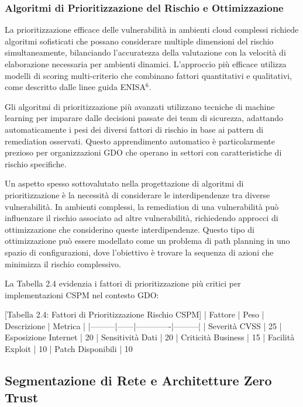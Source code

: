{\subsubsection{Algoritmi di Prioritizzazione del Rischio e Ottimizzazione}

La prioritizzazione efficace delle vulnerabilità in ambienti cloud complessi richiede algoritmi sofisticati che possano considerare multiple dimensioni del rischio simultaneamente, bilanciando l'accuratezza della valutazione con la velocità di elaborazione necessaria per ambienti dinamici. L'approccio più efficace utilizza modelli di scoring multi-criterio che combinano fattori quantitativi e qualitativi, come descritto dalle linee guida ENISA$^{6}$.

Gli algoritmi di prioritizzazione più avanzati utilizzano tecniche di machine learning per imparare dalle decisioni passate dei team di sicurezza, adattando automaticamente i pesi dei diversi fattori di rischio in base ai pattern di remediation osservati. Questo apprendimento automatico è particolarmente prezioso per organizzazioni GDO che operano in settori con caratteristiche di rischio specifiche.

Un aspetto spesso sottovalutato nella progettazione di algoritmi di prioritizzazione è la necessità di considerare le interdipendenze tra diverse vulnerabilità. In ambienti complessi, la remediation di una vulnerabilità può influenzare il rischio associato ad altre vulnerabilità, richiedendo approcci di ottimizzazione che considerino queste interdipendenze. Questo tipo di ottimizzazione può essere modellato come un problema di path planning in uno spazio di configurazioni, dove l'obiettivo è trovare la sequenza di azioni che minimizza il rischio complessivo.

La Tabella 2.4 evidenzia i fattori di prioritizzazione più critici per implementazioni CSPM nel contesto GDO:

[Tabella 2.4: Fattori di Prioritizzazione Rischio CSPM]
| Fattore | Peso | Descrizione | Metrica |
|---------|------|-------------|---------|
| Severità CVSS | 25%
| Esposizione Internet | 20%
| Sensitività Dati | 20%
| Criticità Business | 15%
| Facilità Exploit | 10%
| Patch Disponibili | 10%

\subsection{Segmentazione di Rete e Architetture Zero Trust}

}

